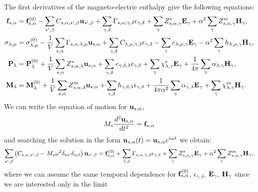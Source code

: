 \documentclass[12pt,a4paper]{article}
\begin{document}
{\color{web-blue}
The first derivatives of the magneto-electric enthalpy give the following equations:
\begin{align}
{\bf f}_{s,\alpha}&= {\bf f}^{(0)}_{s,\alpha}
-\sum_{s',\beta} C_{s,\alpha,s',\beta} {\bf u}_{s',\beta}
+\sum_{\gamma,\delta}
\Gamma_{s,\alpha,\gamma,\delta} 
\epsilon_{\gamma,\delta} +
\sum_{\gamma} Z^*_{s,\alpha,\gamma} {\bf E}_{\gamma}
+\alpha^2 \sum_{\gamma} 
Z^m_{s,\alpha,\gamma} {\bf H}_{\gamma}, \\
\sigma_{\lambda,\mu}&= \sigma_{\lambda,\mu}^{(0)}
-{1\over V} \sum_{s,\alpha}
\Gamma_{s,\alpha,\lambda,\mu} {\bf u}_{s,\alpha}
+\sum_{\gamma,\delta} C_{\lambda,\mu,\gamma,\delta}  
\epsilon_{\gamma,\delta} -
\sum_{\gamma} e_{\lambda,\mu,\gamma} 
 {\bf E}_{\gamma}
-\alpha^2 \sum_{\gamma}  h_{\lambda,\mu,\gamma} 
{\bf H}_{\gamma}, \\
{\bf P}_{\lambda}&= {\bf P}^{(0)}_{\lambda}
+{1\over V} \sum_{s,\alpha} Z^*_{s,\alpha,\lambda} 
{\bf u}_{s,\alpha} +
\sum_{\gamma,\delta} e_{\gamma,\delta,\lambda} 
\epsilon_{\gamma,\delta} +
\sum_{\gamma} 
\chi^e_{\lambda,\gamma}
{\bf E}_{\gamma} +
{1\over 4 \pi}\sum_{\gamma} \alpha_{\lambda,\gamma} 
{\bf H}_{\gamma}, \\
{\bf M}_{\lambda}&= {\bf M}^{(0)}_{\lambda}
+{1\over V}\sum_{s,\alpha} 
Z^m_{s,\alpha,\lambda} {\bf u}_{s,\alpha} +
\sum_{\gamma,\delta}  h_{\gamma,\delta,\lambda} 
\epsilon_{\gamma,\delta} 
+{1\over 4 \pi \alpha^2} 
\sum_{\gamma} \alpha_{\gamma,\lambda} {\bf E}_{\gamma}
+\sum_{\gamma} 
\chi^m_{\lambda,\gamma}
{\bf H}_{\gamma}.
\end{align}
We can write the equation of motion for ${\bf u}_{s,\alpha}$,
\begin{equation}
M_s {d^2 {\bf u}_{s,\alpha} \over d t^2} = {\bf f}_{s,\alpha}
\end{equation}
and searching the solution in the form ${\bf u}_{s,\alpha}(t)=
{\bf u}_{s,\alpha} e^{i\omega t}$ we obtain:
\begin{equation}
\sum_{s',\beta} \left(C_{s,\alpha,s',\beta} - 
M_s \omega^2 \delta_{ss'}\delta_{\alpha\beta}\right)
{\bf u}_{s',\beta}= {\bf f}^{(0)}_{s,\alpha} + \sum_{\gamma,\delta} 
\Gamma_{s,\alpha,\gamma,\delta} \epsilon_{\gamma,\delta}
+ \sum_{\gamma} Z^*_{s,\alpha,\gamma} {\bf E}_{\gamma} 
+ \alpha^2 \sum_{\gamma} Z^m_{s,\alpha,\gamma} 
{\bf H}_{\gamma},
\end{equation}
where we can assume the same temporal dependence for
${\bf f}^{(0)}_{s,\alpha}$, $\epsilon_{\gamma,\delta}$,
${\bf E}_{\gamma}$,
${\bf H}_{\gamma}$ since we are interested only in the limit
}
\end{document}
